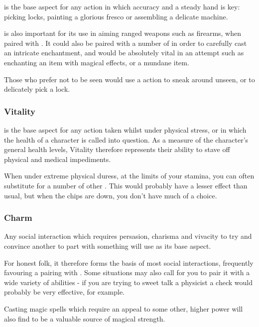  is the base aspect for any action in which accuracy and a steady hand is key: picking locks, painting a glorious fresco or assembling a delicate machine. 

 is also important for its use in aiming ranged weapons such as firearms, when paired with . It could also be paired with a number of  in order to carefully cast an intricate enchantment, and  would be absolutely vital in an  attempt such as enchanting an item with magical effects, or  a mundane item. 

Those who prefer not to be seen would use a  action to sneak around unseen, or to delicately pick a lock. 



\subsubsection{Vitality}

 is the base aspect for any action taken whilst under physical stress, or in which the health of a character is called into question. As a measure of the character's general health levels, Vitality therefore represents their ability to stave off physical and medical impediments. 

When under extreme physical duress, at the limits of your stamina, you can often substitute  for a number of other . This would probably have a lesser effect than usual, but when the chips are down, you don't have much of a choice.  

\subsubsection{Charm} 

Any social interaction which requires persasion, charisma and vivacity to try and convince another to part with something will use  as its base aspect. 

For honest folk, it therefore forms the basis of most social interactions, frequently favouring a pairing with . Some situations may also call for you to pair it with a wide variety of  abilities - if you are trying to sweet talk a physicist a  check would probably be very effective, for example.

Casting magic spells which require an appeal to some other, higher power will also find  to be a valuable source of magical strength. 


